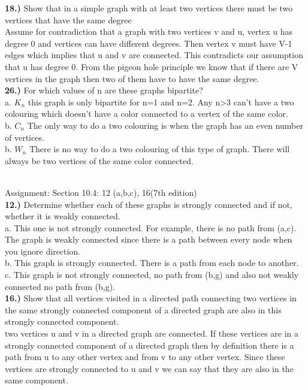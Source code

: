 \documentclass{article}
\begin{document}
\textbf{18.)} Show that in a simple graph with at least two vertices there must be two vertices that
have the same degree\\

Assume for contradiction that a graph with two vertices v and u, vertex u has degree 0 and vertices can have different degrees.  Then vertex v must have V-1 edges which implies that u and v are connected.  This contradicts our assumption that u has degree 0. From the pigeon hole principle we know that if there are V vertices in the graph then two of them have to have the same degree. \\

\textbf{26.)} For which values of n are these graphs bipartite?\\

a. $K_n$  this graph is only bipartite for n=1 and n=2.  Any n>3 can't have a two colouring which doesn't have a color connected to a vertex of the same color. \\

b. $C_n$  The only way to do a two colouring is when the graph has an even number of vertices.\\

b. $W_n$ There is no way to do a two colouring of this type of graph.  There will always be two vertices of the same color connected. 

\hrulefill\\

Assignment: Section 10.4: 12 (a,b,c), 16(7th edition)\\

\textbf{12.)} Determine whether each of these graphs is strongly connected and if not, whether it is
weakly connected.\\

a. This one is not strongly connected.  For example, there is no path from (a,c).  The graph is weakly connected since there is a path between every node when you ignore direction. \\

b. This graph is strongly connected.  There is a path from each node to another. \\

c. This graph is not strongly connected, no path from (b,g) and also not weakly connected no path from (b,g).\\

\textbf{16.)} Show that all vertices visited in a directed path connecting two vertices in the same
strongly connected component of a directed graph are also in this strongly connected component.\\

two vertices u and v in a directed graph are connected. If these vertices are in a strongly connected component of a directed graph then by definition there is a path from u to any other vertex and from v to any other vertex.  Since these vertices are strongly connected to u and v we can say that they are also in the same component. 
\end{document}
